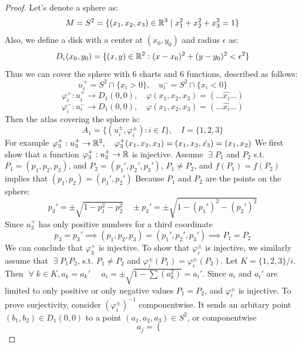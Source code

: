 \documentclass[11pt,a4paper]{report}
\begin{document}
\begin{proof}
Let's denote a sphere as:
\begin{equation} \label{s2}
 M = S^2 = \{(x_1,x_2,x_3) \in \mathbb{R}^3 \mid x_1^2 + x_2^2 + x_3^2 = 1 \} 
\end{equation}
Also, we define a disk with a center at $(x_0,y_0)$ and radius $\epsilon$ as:
$$ D_{\epsilon}(x_0,y_0) = \{(x,y) \in \mathbb{R}^2 : (x-x_0)^2 + (y-y_0)^2 < \epsilon^2 \} $$
\noindent Thus we can cover the sphere with 6 charts and 6 functions, described as follows:
$$ u_i^{+} = S^2 \cap \{x_i > 0 \}, \quad u_i^{-} = S^2 \cap \{x_i < 0 \} $$
$$ \varphi_i^{+}: u_i^{+} \to D_{1}(0,0), \quad \varphi(x_1,x_2,x_3) = (\dots \hat{x_i} \dots)$$
$$ \varphi_i^{-}: u_i^{-} \to D_{1}(0,0), \quad \varphi(x_1,x_2,x_3) = (\dots \hat{x_i} \dots)$$
Then the atlas covering the sphere is:
$$ A_1 = \{(u_i^{\pm},\varphi_i^{\pm}) : i \in I \}, \quad I = \{ 1,2,3 \} $$
For example $\varphi_3^{+}: u_3^{+} \to \mathbb{R}^2, \quad \varphi_3^{+}(x_1,x_2,x_3) = (x_1,x_2,\hat{x_3}) =(x_1,x_2)$
\newline
\newline
We first show that a function $\varphi_3^{+}: u_3^{+} \to \mathbb{R}$ is injective.
\newline
Assume $ \; \exists \; P_1$ and $P_2$ s.t. $P_1 = (p_1,p_2,p_3)$,
and $P_2 = (p_1',p_2',p_3')$, $P_1 \neq P_2$, and $f(P_1) = f(P_2)$ implies that $(p_1,p_2) = (p_1 ', p_2 ')$
Because $P_1$ and $P_2$ are the points on the sphere:
$$p_3 ' = \pm \sqrt{1-p_1^2-p_2^2} \quad \pm p_3' = \pm \sqrt{1-(p_1')^2-(p_2')^2}$$
Since $u_3^{+}$ has only positive numbers for a third coordinate
$$ p_3 = p_3' \implies (p_1,p_2,p_3) = (p_1 ',p_2 ',p_3 ') \implies P_1=P_2$$
We can conclude that $\varphi_3^{+}$ is injective.
\newline
\newline
To show that $\varphi_i^{\pm}$ is injective, we similarly assume that $ \; \exists \; P_1 P_2$, s.t. $P_1 \neq P_2$ and 
$\varphi_i^{\pm}(P_1) = \varphi_i^{\pm}(P_2)$. Let $K= \{1,2,3\}/i$. Then $ \; \forall \; k \in K, a_k= a_k '$ 
$\quad a_i = \pm \sqrt{1-\sum(a_k^2)} = a_i '$. Since $a_i$ and $a_i '$ are limited to only positive or only
negative values  $P_1 = P_2$, and $\varphi_i^{\pm}$ is injective.
\newline
\newline
To prove surjectivity, consider $(\varphi_i^{\pm})^{-1}$ componentwise. It sends an arbitary point $(b_1,b_2) \in D_1(0,0)$ to a point $(a_1,a_2,a_3) \in S^2$, or componentwise
\[
  a_j =
  \begin{cases}

\end{cases}\]
\end{proof}
\end{document}
